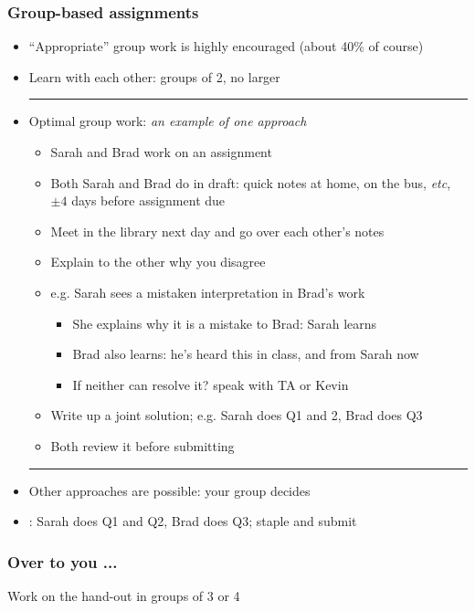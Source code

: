 \begin{frame}\frametitle{Group-based assignments}
	\begin{itemize}
		\item	``Appropriate'' group work is highly encouraged (about 40\% of course)
		\item	Learn with each other: groups of 2, no larger
		\vspace{2pt}\hrule\vspace{2pt}
		\item	Optimal group work: \emph{an example of one approach}
			\begin{itemize}
				\item	Sarah and Brad work on an assignment
				\item	Both Sarah and Brad do {} in draft: quick notes at home, on the bus, \emph{etc}, $\pm 4$ days before assignment due
				\pause
				\item	Meet in the library next day and go over each other's notes
				\item	Explain to the other why you disagree
				\item	e.g. Sarah sees a mistaken interpretation in Brad's work
				\begin{itemize}
					\item	She explains why it is a mistake to Brad: Sarah learns
					\item	Brad also learns: he's heard this in class, and from Sarah now
					\item	If neither can resolve it? speak with TA or Kevin					
				\end{itemize}
				\pause
				\item	Write up a joint solution; e.g. Sarah does Q1 and 2, Brad does Q3
				\item	Both review it before submitting
			\end{itemize}
		\vspace{2pt}\hrule\vspace{2pt}
		\pause		
		\item	Other approaches are possible: your group decides
		\item	\color{myOrange}{What doesn't work}: Sarah does Q1 and Q2, Brad does Q3; staple and submit
	\end{itemize}
\end{frame}

\begin{frame}\frametitle{Over to you ...}
	Work on the hand-out in groups of 3 or 4
\end{frame}